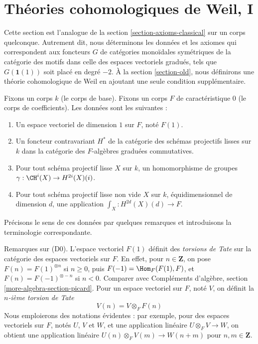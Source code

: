 














\section{Théories cohomologiques de Weil, I}
\label{section-axioms}

\noindent
Cette section est l'analogue de la section \ref{section-axioms-classical}
sur un corps quelconque. Autrement dit, nous déterminons les données
et les axiomes qui correspondent aux foncteurs $G$ de catégories monoïdales symétriques
de la catégorie des motifs dans celle des espaces vectoriels gradués, tels que
$G(\mathbf{1}(1))$ soit placé en degré $-2$. À la section \ref{section-old},
nous définirons une théorie cohomologique de Weil en ajoutant une seule
condition supplémentaire.

\medskip\noindent
Fixons un corps $k$ (le corps de base).
Fixons un corps $F$ de caractéristique $0$ (le corps de coefficients).
Les données sont les suivantes :
\begin{enumerate}
\item[(D0)] Un espace vectoriel de dimension $1$ sur $F$, noté $F(1)$.
\item[(D1)] Un foncteur contravariant $H^*$ de la catégorie
des schémas projectifs lisses sur $k$ dans la catégorie des
$F$-algèbres graduées commutatives.
\item[(D2)] Pour tout schéma projectif lisse $X$ sur $k$,
un homomorphisme de groupes $\gamma : \CH^i(X) \to H^{2i}(X)(i)$.
\item[(D3)] Pour tout schéma projectif lisse non vide $X$ sur $k$,
équidimensionnel de dimension $d$, une application
$\int_X : H^{2d}(X)(d) \to F$.
\end{enumerate}
Précisons le sens de ces données par quelques remarques
et introduisons la terminologie correspondante.

\medskip\noindent
Remarques sur (D0).
L'espace vectoriel $F(1)$ définit des {\it torsions de Tate} sur la catégorie
des espaces vectoriels sur $F$. En effet, pour $n \in \mathbf{Z}$, on pose
$F(n) = F(1)^{\otimes n}$ si $n \geq 0$, puis $F(-1) = \Hom_F(F(1), F)$,
et $F(n) = F(-1)^{\otimes - n}$ si $n < 0$. Comparer avec
Compléments d'algèbre, section \ref{more-algebra-section-picard}.
Pour un espace vectoriel sur $F$, noté $V$, on définit la {\it $n$-ième torsion de Tate}
$$
V(n) = V \otimes_F F(n)
$$
Nous emploierons des notations évidentes : par exemple, pour des espaces vectoriels sur $F$, notés $U$, $V$
et $W$, et une application linéaire $U \otimes_F V \to W$, on obtient une application
linéaire $U(n) \otimes_F V(m) \to W(n + m)$ pour $n, m \in \mathbf{Z}$.

